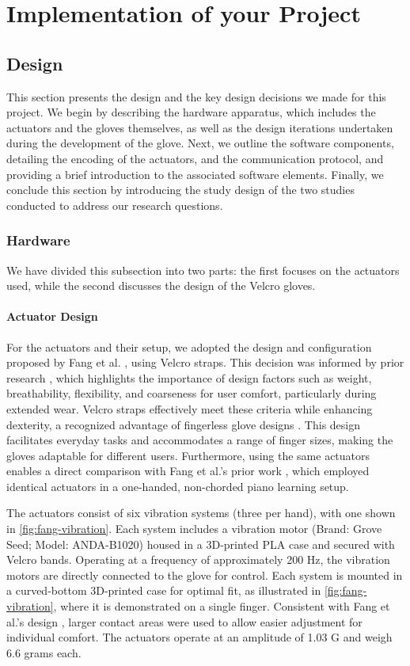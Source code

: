 \chapter{Implementation of your Project}
\label{ch:Implementation}

\section{Design}
This section presents the design and the key design decisions we made for this project.
We begin by describing the hardware apparatus, which includes the actuators and the gloves themselves, as well as the design iterations undertaken during the development of the glove.
Next, we outline the software components, detailing the encoding of the actuators, and the communication protocol, and providing a brief introduction to the associated software elements.
Finally, we conclude this section by introducing the study design of the two studies conducted to address our research questions.


\subsection{Hardware}
We have divided this subsection into two parts: the first focuses on the actuators used, while the second discusses the design of the Velcro gloves.

\subsubsection{Actuator Design}
For the actuators and their setup, we adopted the design and configuration proposed by Fang et al. \cite{Fang2023}, using Velcro straps. This decision was informed by prior research \cite{Markow2010, Kohlsdorf2010, Huang2010, Fang2023a}, which highlights the importance of design factors such as weight, breathability, flexibility, and coarseness for user comfort, particularly during extended wear. Velcro straps effectively meet these criteria while enhancing dexterity, a recognized advantage of fingerless glove designs \cite{Huang2008}. This design facilitates everyday tasks and accommodates a range of finger sizes, making the gloves adaptable for different users. Furthermore, using the same actuators enables a direct comparison with Fang et al.’s prior work \cite{Fang2023}, which employed identical actuators in a one-handed, non-chorded piano learning setup.

The actuators consist of six vibration systems (three per hand), with one shown in \autoref{fig:fang-vibration}. Each system includes a vibration motor (Brand: Grove Seed; Model: ANDA-B1020) housed in a 3D-printed PLA case and secured with Velcro bands. Operating at a frequency of approximately 200 Hz, the vibration motors are directly connected to the glove for control. Each system is mounted in a curved-bottom 3D-printed case for optimal fit, as illustrated in \autoref{fig:fang-vibration}, where it is demonstrated on a single finger. Consistent with Fang et al.’s design \cite{Fang2023}, larger contact areas were used to allow easier adjustment for individual comfort. The actuators operate at an amplitude of 1.03 G and weigh 6.6 grams each.

